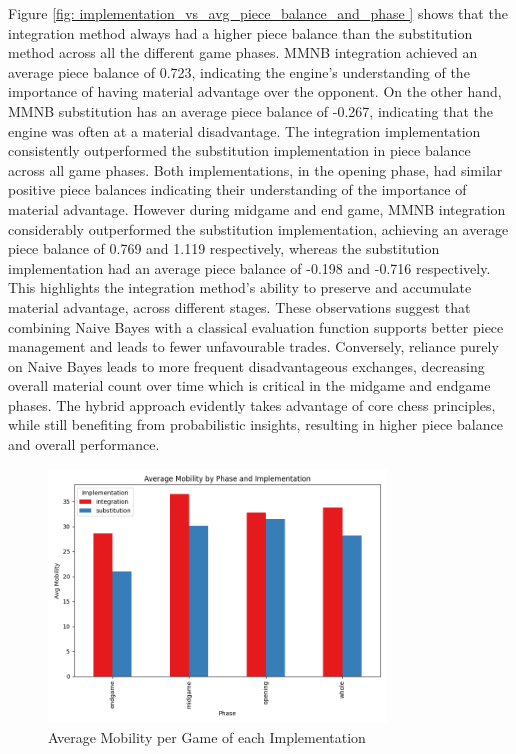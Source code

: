Figure \ref{fig: implementation_vs_avg_piece_balance_and_phase } shows that the integration method always had a higher piece balance than the substitution method across all the different game phases. MMNB integration achieved an average piece balance of 0.723, indicating the engine's understanding of the importance of having material advantage over the opponent. On the other hand, MMNB substitution has an average piece balance of -0.267, indicating that the engine was often at a material disadvantage. The integration implementation consistently outperformed the substitution implementation in piece balance across all game phases. Both implementations, in the opening phase, had similar positive piece balances indicating their understanding of the importance of material advantage. However during midgame and end game, MMNB integration considerably outperformed the substitution implementation, achieving an average piece balance of 0.769 and 1.119 respectively, whereas the substitution implementation had an average piece balance of -0.198 and -0.716 respectively. This highlights the integration method's ability to preserve and accumulate material advantage, across different stages. These observations suggest that combining Naive Bayes with a classical evaluation function supports better piece management and leads to fewer unfavourable trades. Conversely, reliance purely on Naive Bayes 
leads to more frequent disadvantageous exchanges, decreasing overall material count over time which is critical in the midgame and endgame phases. The hybrid approach evidently takes 
advantage of core chess principles, while still benefiting from probabilistic insights, resulting in higher piece balance and overall performance.

\begin{figure}[H]
    \centering
    \includegraphics[width=0.8\textwidth]{images/plots/implementation/Implementation_vs_avg_mobility_and_phase.png}
    \caption{Average Mobility per Game of each Implementation}
    \label{fig: implementation_vs_avg_mobility_and_phase}
\end{figure}

